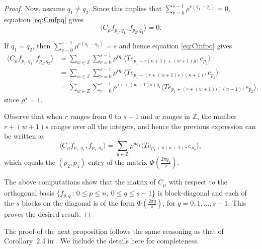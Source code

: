 \documentclass[12pt,reqno]{amsart}
\theoremstyle{definition}
\newcommand{\Z}{{\mathbb{Z}}}
\begin{document}
\begin{proof}
Now, assume $q_1 \neq q_2$. Since this implies that  $\sum_{v=0}^{s-1} \rho^{v(q_1-q_2)}=0$, equation \eqref{eq:Cmfpq} gives
\[
\langle C_{\mu} f_{p_1, q_1}, f_{p_2, q_2} \rangle =0.
\]

If $q_1=q_2$, then $\sum_{v=0}^{s-1} \rho^{v(q_1-q_2)}=s$ and hence equation \eqref{eq:Cmfpq} gives
\begin{align*}
\langle C_{\mu} f_{p_1, q_1}, f_{p_2, q_2} \rangle 
&=\sum_{w \in {\mathbb Z}}
       \sum_{r=0}^{s-1} \rho^{r q_1}  \langle
      T e_{p_1 + r(n+1) +(w+1) \mu}, e_{p_2} \rangle \\
&=\sum_{w \in {\mathbb Z}}
       \sum_{r=0}^{s-1} \rho^{r q_1}  \langle
      T e_{p_1 + (r+(w+1)s)(n+1)}, e_{p_2} \rangle \\
&=\sum_{w \in {\mathbb Z}}
       \sum_{r=0}^{s-1} \rho^{(r+(w+1)s)q_1}  \langle
      T e_{p_1 + (r+(w+1)s)(n+1)}, e_{p_2} \rangle,
\end{align*}
since $\rho^s=1$.

Observe that when $r$ ranges from $0$ to $s-1$ and $w$ ranges in $\Z$, the number $r+(w+1)s$ ranges over all the integers, and hence the previous expression can be written as
\[
\langle C_{\mu} f_{p_1, q_1}, f_{p_2, q_2} \rangle = \sum_{u \in {\mathbb Z}} \rho^{u q_1}  \langle
      T e_{p_1 + u (n+1)}, e_{p_2} \rangle,
\]
which equals the $(p_2,p_1)$ entry of the matrix $\Phi\left(\frac{2\pi q_1}{s}\right)$.

The above computations show that the matrix of $C_\mu$ with respect to the orthogonal basis $\{ f_{p,q} \, : \, 0 \leq p \leq n, \ 0  \leq q \leq s-1\}$ is block-diagonal and each of the $s$ blocks on the diagonal is of the form $\Phi\left(\frac{2\pi q}{s}\right)$, for $q=0, 1, \dots, s-1$. This proves the desired result.
\end{proof}

The proof of the next proposition follows the same reasoning as that of Corollary~2.4 in \cite{IM}. We include the details here for completeness.
 
\end{document}

